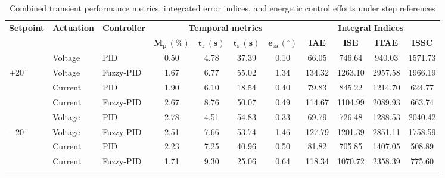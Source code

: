 \documentclass[pdflatex,sn-mathphys-num,iicol]{sn-jnl}
\theoremstyle{thmstyleone}%
\theoremstyle{thmstyletwo}%
\theoremstyle{thmstylethree}%
\begin{document}
\begin{table}[t]
\caption{Combined transient performance metrics, integrated error indices, and energetic control efforts under step references}\label{tab:performance_metrics_combined}%
\begin{center}
\begin{minipage}{\textwidth}
\scriptsize %
\setlength{\tabcolsep}{3pt} %
\begin{tabular*}{\textwidth}{@{\extracolsep{\fill}}@{}lllcccccccc@{}}
\toprule
\textbf{Setpoint} & \textbf{Actuation} & \textbf{Controller} & \multicolumn{4}{c}{\textbf{Temporal metrics}} & \multicolumn{4}{c}{\textbf{Integral Indices}} \\
\cmidrule(lr){4-7} \cmidrule(lr){8-11}
& & & $\mathbf{M_p\,(\%)}$ & $\mathbf{t_r\,(\text{s})}$ & $\mathbf{t_s\,(\text{s})}$ & $\mathbf{e_{\text{ss}}\,(^{\circ})}$ & \textbf{IAE} & \textbf{ISE} & \textbf{ITAE} & \textbf{ISSC} \\
\midrule
            & Voltage  & PID       & 0.50 & 4.78 & 37.39 & 0.10 & 66.05  & 746.64  & 940.03  & 1571.73 \\
$+20^{\circ}$ & Voltage  & Fuzzy-PID & 1.67 & 6.77 & 55.02 & 1.34 & 134.32 & 1263.10 & 2957.58 & 1966.19 \\
            & Current  & PID       & 1.90 & 6.10 & 18.54 & 0.40 & 79.83  & 845.22  & 1214.70 & 624.77  \\
            & Current  & Fuzzy-PID & 2.67 & 8.76 & 50.07 & 0.49 & 114.67 & 1104.99 & 2089.93 & 663.74  \\
\midrule
            & Voltage  & PID       & 2.78 & 4.51 & 54.83 & 0.33 & 69.79  & 726.48  & 1288.53 & 2040.42 \\
$-20^{\circ}$ & Voltage  & Fuzzy-PID & 2.51 & 7.66 & 53.74 & 1.46 & 127.79 & 1201.39 & 2851.11 & 1758.59 \\
            & Current  & PID       & 2.23 & 7.25 & 40.96 & 0.50 & 81.82  & 705.85  & 1407.05 & 508.89  \\
            & Current  & Fuzzy-PID & 1.71 & 9.30 & 25.06 & 0.64 & 118.34 & 1070.72 & 2358.39 & 775.60  \\
\botrule
\label{parametros}
\end{tabular*} 
\end{minipage}
\end{center}
\end{table}
\end{document}

